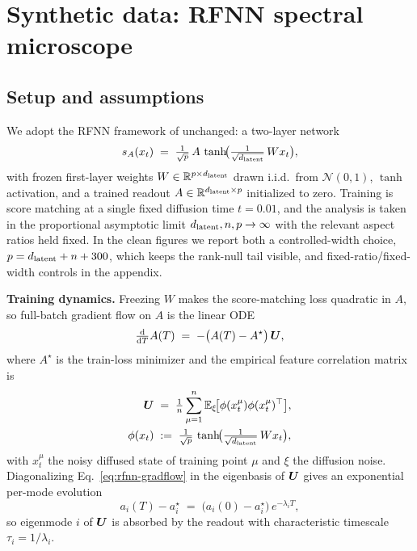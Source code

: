 \section{Synthetic data: RFNN spectral microscope}
\label{sec:rfnn}

\subsection{Setup and assumptions}
\label{sec:rfnn-setup}

We adopt the RFNN framework of \citet{bonnaire2025} unchanged: a
two-layer network
\begin{equation}
  s_A(x_t) \;=\; \tfrac{1}{\sqrt{p}}\,A\,
  \tanh\!\bigl(\tfrac{1}{\sqrt{d_{\mathrm{latent}}}}\,W x_t\bigr),
  \label{eq:rfnn}
\end{equation}
with frozen first-layer
weights $W \in \mathbb{R}^{p \times d_{\mathrm{latent}}}$ drawn i.i.d.\ from
$\mathcal{N}(0, 1)$, $\tanh$ activation, and a trained readout
$A \in \mathbb{R}^{d_{\mathrm{latent}} \times p}$ initialized to zero. Training is
score matching at a single fixed diffusion time $t = 0.01$, and the
analysis is taken in the proportional asymptotic limit
$d_{\mathrm{latent}}, n, p \to \infty$ with the relevant aspect ratios
held fixed. In the clean figures we report both a controlled-width
choice, $p=d_{\mathrm{latent}}+n+300$, which keeps the rank-null tail
visible, and fixed-ratio/fixed-width controls in the appendix.

\textbf{Training dynamics.}
Freezing $W$ makes the score-matching loss quadratic in $A$, so
full-batch gradient flow on $A$ is the linear ODE
\begin{equation}
  \tfrac{\mathrm{d}}{\mathrm{d} T} A(T) \;=\; -\bigl(A(T) - A^{\star}\bigr)\,\bm{U},
  \label{eq:rfnn-gradflow}
\end{equation}
where $A^\star$ is the train-loss minimizer and the empirical
feature correlation matrix is
\begin{align}
  \bm{U} \;&=\; \tfrac{1}{n}\sum_{\mu=1}^{n}
    \mathbb{E}_{\xi}\!\bigl[\phi(x_t^{\mu})\phi(x_t^{\mu})^{\top}\bigr],
  \label{eq:U} \\
  \phi(x_t) \;&:=\; \tfrac{1}{\sqrt{p}}\,
    \tanh\!\bigl(\tfrac{1}{\sqrt{d_{\mathrm{latent}}}}\, W x_t\bigr),
\end{align}
with $x_t^\mu$ the noisy diffused state of training point $\mu$ and
$\xi$ the diffusion noise. Diagonalizing
Eq.~\eqref{eq:rfnn-gradflow} in the eigenbasis of $\bm{U}$ gives an
exponential per-mode evolution
\begin{equation}
  a_i(T) - a_i^{\star} \;=\; \bigl(a_i(0) - a_i^{\star}\bigr)\,
    e^{-\lambda_i T},
  \label{eq:rfnn-mode-decay}
\end{equation}
so eigenmode $i$ of $\bm{U}$ is absorbed by the readout with
characteristic timescale $\tau_i = 1/\lambda_i$.


